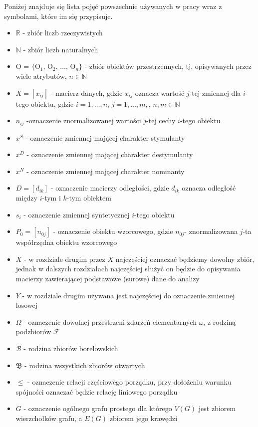 \documentclass[12pt,a4paper]{report}
\newcommand{\mediana}{\operatorname{med}}
\newcommand{\licznosc}[1]{\overline{\overline{#1}}}
\begin{document}
Poniżej znajduje się lista pojęć powszechnie używanych w pracy wraz z symbolami, które im się przypisuje. 
  
\begin{itemize}
\item $\mathbb{R}$ - zbiór liczb rzeczywistych
\item $\mathbb{N}$ - zbiór liczb naturalnych
\item O = $\{$O$_{1}$, O$_{2}$, $\dots$, O$_{n}\}$ - zbiór obiektów przestrzennych, tj. opisywanych przez wiele atrybutów, $n \in \mathbb{N}$
\item $X=[x_{ij}]$ - macierz danych, gdzie $x_{ij}$-oznacza wartość $j$-tej zmiennej dla $i$-tego obiektu, gdzie $i=1,\ldots,n$, $j=1,\ldots, m,$, $n,m \in \mathbb{N}$
\item $n_{ij}$ -oznaczenie znormalizowanej wartości $j$-tej cechy $i$-tego obiektu
\item $x^{S}$ - oznaczenie zmiennej mającej charakter stymulanty
\item $x^{D}$ - oznaczenie zmiennej mającej charakter destymulanty
\item $x^{N}$ - oznaczenie zmiennej mającej charakter nominanty
\item $D=[d_{ik}]$ - oznaczenie macierzy odległości, gdzie $d_{ik}$ oznacza odległość między $i$-tym i $k$-tym obiektem
\item $s_{i}$ - oznaczenie zmiennej syntetycznej $i$-tego obiektu
\item $P_{0}=[n_{0j}]$ - oznaczenie obiektu wzorcowego, gdzie $n_{0j}$- znormalizowana $j$-ta współrzędna obiektu wzorcowego
\item $X$ - w rozdziale drugim przez $X$ najczęściej oznaczać będziemy dowolny zbiór, jednak w dalszych rozdziałach najczęściej służyć on będzie do opisywania macierzy zawierającej podstawowe (surowe) dane do analizy
\item $Y$ - w rozdziale drugim używana jest najczęściej do oznaczenie zmiennej losowej
\item $\Omega$ - oznaczenie dowolnej przestrzeni zdarzeń elementarnych $\omega$, z rodziną podzbiorów $\mathcal{F}$
\item $\mathcal{B}$ - rodzina zbiorów borelowskich
\item $\mathfrak{B}$ - rodzina wszystkich zbiorów otwartych %
\item $\leq$ - oznaczenie relacji częściowego porządku, przy dołożeniu warunku spójności oznaczać będzie relację liniowego porządku
\item $G$ - oznaczenie ogólnego grafu prostego dla którego $V(G)$ jest zbiorem wierzchołków grafu, a $E(G)$ zbiorem jego krawędzi



\end{itemize}
\end{document}
